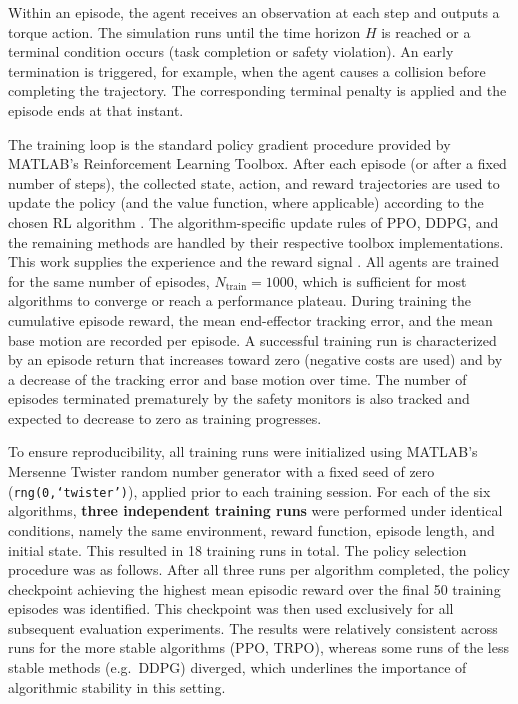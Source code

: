 \documentclass{ieeeaccess}
\begin{document}
Within an episode, the agent receives an observation at each step and outputs a
torque action. The
simulation runs until the time horizon $H$ is reached or a terminal condition occurs
(task completion or safety violation). An early termination is triggered, for example, when the
agent causes a collision before completing the trajectory. The corresponding terminal penalty is applied
and the episode ends at that instant.

The training loop is the standard policy gradient procedure provided by MATLAB's Reinforcement Learning
Toolbox. After each episode (or after a fixed number of steps), the collected state,
action, and reward trajectories are used to
update the policy (and the value function, where applicable) according to the chosen RL
algorithm \cite{b4}. The algorithm-specific update rules of PPO, DDPG, and the remaining methods are
handled by their respective toolbox implementations. This work supplies the experience and the reward
signal \cite{b7}.
All agents are trained for the same number of episodes, $N_{\mathrm{train}} = 1000$, which
is sufficient for most algorithms to
converge or reach a performance plateau. During training the cumulative episode reward, the mean
end-effector tracking error, and the mean base motion are recorded per episode. A successful
training run is characterized by an episode return that increases toward zero (negative costs
are used) and by a decrease of the tracking error and base motion over
time. The number of episodes terminated prematurely by the safety monitors is also tracked
and expected to decrease to zero as training progresses.

To ensure reproducibility, all training runs were initialized using MATLAB's Mersenne Twister random number
generator with a fixed seed of zero (\texttt{rng(0,`twister')}), applied prior to each training session.
For each of the six algorithms, \textbf{three independent training runs} were performed under identical
conditions, namely the same environment, reward function, episode length, and initial state. This resulted
in 18 training runs in total. The policy selection procedure was as follows. After
all three runs per algorithm completed, the policy checkpoint achieving the highest mean episodic
reward over the final 50 training episodes was identified. This checkpoint was then used
exclusively for all subsequent evaluation experiments. The results were relatively consistent across runs for
the more stable algorithms (PPO, TRPO), whereas some runs of the less stable methods
(e.g.\ DDPG) diverged, which underlines the importance of algorithmic stability in this setting.
\end{document}
